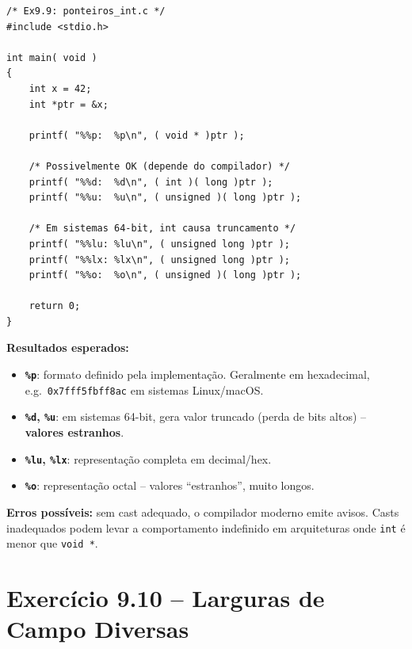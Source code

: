 \documentclass[12pt,a4paper]{article}
\begin{document}
\begin{respostabox}
\begin{lstlisting}
/* Ex9.9: ponteiros_int.c */
#include <stdio.h>

int main( void )
{
    int x = 42;
    int *ptr = &x;

    printf( "%%p:  %p\n", ( void * )ptr );

    /* Possivelmente OK (depende do compilador) */
    printf( "%%d:  %d\n", ( int )( long )ptr );
    printf( "%%u:  %u\n", ( unsigned )( long )ptr );

    /* Em sistemas 64-bit, int causa truncamento */
    printf( "%%lu: %lu\n", ( unsigned long )ptr );
    printf( "%%lx: %lx\n", ( unsigned long )ptr );
    printf( "%%o:  %o\n", ( unsigned )( long )ptr );

    return 0;
}
\end{lstlisting}

\textbf{Resultados esperados:}
\begin{itemize}[noitemsep]
  \item \textbf{\texttt{\%p}}: formato definido pela implementação. Geralmente
  em hexadecimal, e.g.\ \texttt{0x7fff5fbff8ac} em sistemas Linux/macOS.
  \item \textbf{\texttt{\%d}, \texttt{\%u}}: em sistemas 64-bit, gera valor truncado
  (perda de bits altos) -- \textbf{valores estranhos}.
  \item \textbf{\texttt{\%lu}, \texttt{\%lx}}: representação completa em decimal/hex.
  \item \textbf{\texttt{\%o}}: representação octal -- valores ``estranhos'', muito longos.
\end{itemize}

\textbf{Erros possíveis:} sem cast adequado, o compilador moderno emite avisos.
Casts inadequados podem levar a comportamento indefinido em arquiteturas onde
\texttt{int} é menor que \texttt{void *}.
\end{respostabox}

\section{Exercício 9.10 -- Larguras de Campo Diversas}
\end{document}
